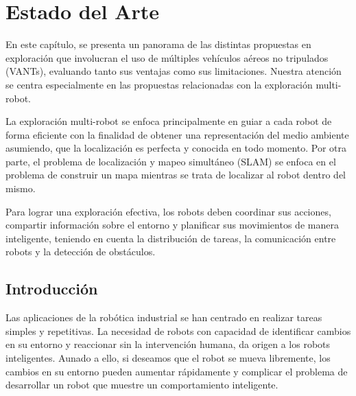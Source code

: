 \chapter{Estado del Arte}

En este capítulo, se presenta un panorama de las distintas propuestas en exploración que involucran el uso de múltiples vehículos aéreos no tripulados (VANTs), evaluando tanto sus ventajas como sus limitaciones. Nuestra atención se centra especialmente en las propuestas relacionadas con la exploración multi-robot. %


La exploración multi-robot se enfoca principalmente en guiar a cada robot de forma eficiente con la finalidad de obtener una representación del medio ambiente asumiendo, que la localización es perfecta y conocida en todo momento. Por otra parte, el problema de localización y mapeo simultáneo (SLAM) se enfoca en el problema de construir un mapa mientras se trata de localizar al robot dentro del mismo.

Para lograr una exploración efectiva, los robots deben coordinar sus acciones, compartir información sobre el entorno y planificar sus movimientos de manera inteligente, teniendo en cuenta la distribución de tareas, la comunicación entre robots y la detección de obstáculos.%


\section{Introducción}

Las aplicaciones de la rob\'{o}tica industrial se han centrado en realizar tareas simples y repetitivas. La necesidad de robots con capacidad de identificar cambios en su entorno y reaccionar sin la intervenci\'{o}n humana, da origen a los robots inteligentes. Aunado a ello, si deseamos que el robot se mueva libremente, los cambios en su entorno pueden aumentar r\'{a}pidamente y complicar el problema de desarrollar un robot que muestre un comportamiento inteligente.

